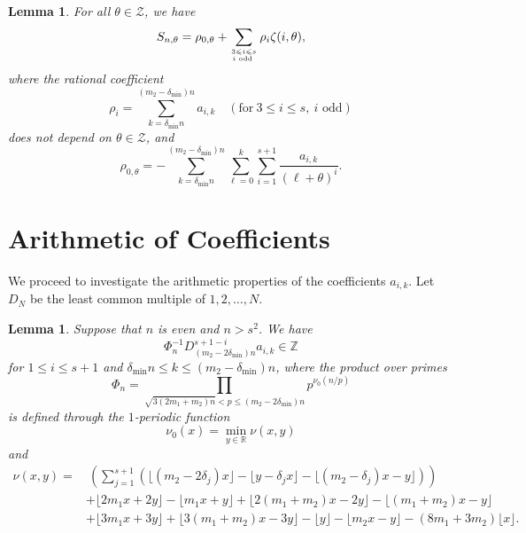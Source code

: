 \documentclass[11pt]{amsart}
\newtheorem{lemma}[theorem]{Lemma}
\numberwithin{equation}{section}
\begin{document}
\begin{lemma}
For all $\theta \in \mathcal{Z}$, we have
\[ S_{n,\theta} = \rho_{0,\theta} + \sum_{3 \leqslant i \leqslant s \atop i \text{~odd~}} \rho_i \zeta(i,\theta), \]
where the rational coefficient
\begin{equation}\label{rho_i}
\rho_i = \sum_{k = \delta_{\min}n}^{(m_2-\delta_{\min})n} a_{i,k} \quad(\text{for}~3 \leqslant i \leqslant s,~i \text{~odd})
\end{equation}
does not depend on $\theta \in \mathcal{Z}$, and
\begin{equation}\label{rho_0}
\rho_{0, \theta}=-\sum_{k = \delta_{\min}n}^{(m_2-\delta_{\min})n} \sum_{\ell=0}^{k} \sum_{i=1}^{s+1} \frac{a_{i, k}}{(\ell+\theta)^{i}}.
\end{equation}
\end{lemma}

\bigskip

\section{Arithmetic of Coefficients}
We proceed to investigate the arithmetic properties of the coefficients $a_{i,k}$. Let $D_N$ be the least common multiple of $1,2,\ldots,N$.

\begin{lemma}\label{arithmetic_lemma_for_a_i_k}
Suppose that $n$ is even and $n > s^2$. We have
\[ \Phi_{n}^{-1} D_{(m_2-2\delta_{\min})n}^{s+1-i} a_{i,k} \in \mathbb{Z} \]
for $1 \leqslant i \leqslant s+1$ and $\delta_{\min}n \leqslant k \leqslant (m_2-\delta_{\min})n$, where the product over primes
\[ \Phi_n  = \prod_{\sqrt{3(2m_1+m_2)n} < p \leqslant (m_2-2\delta_{\min})n} p^{\nu_0(n/p)} \]
is defined through the $1$-periodic function
\[ \nu_0(x) = \min_{ y \in \mathbb{R} } \nu(x,y)  \]
and
\begin{align*}
\nu(x,y) = &~\left( \sum_{j=1}^{s+1} \left( \lfloor (m_2 - 2\delta_j)x \rfloor - \lfloor y-\delta_{j}x \rfloor - \lfloor (m_2-\delta_j)x - y \rfloor \right) \right) \\
&+  \lfloor 2m_{1}x + 2y \rfloor - \lfloor m_{1}x + y \rfloor + \lfloor 2(m_1+m_2)x - 2y \rfloor - \lfloor (m_1+m_2)x - y \rfloor    \\
&+  \lfloor 3m_{1}x+3y \rfloor + \lfloor 3(m_1+m_2)x - 3y \rfloor - \lfloor y \rfloor - \lfloor m_2x-y \rfloor - (8m_1+3m_2)\lfloor x \rfloor.
\end{align*}
\end{lemma}
\end{document}
